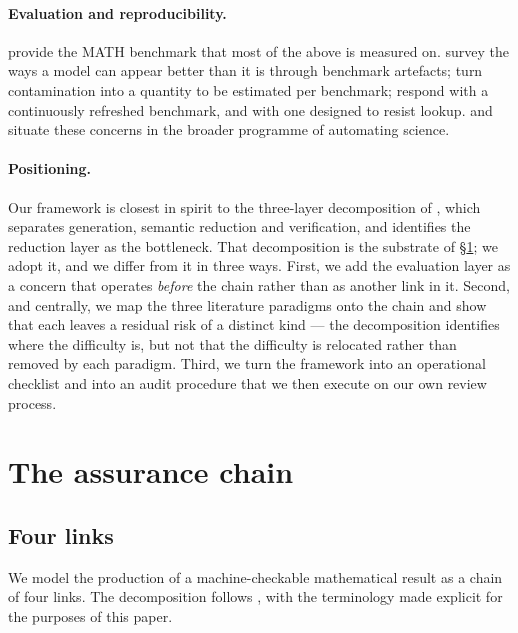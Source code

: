 \documentclass[11pt,a4paper]{article}
\begin{document}
\paragraph{Evaluation and reproducibility.} \citet{hendrycks2021math} provide
the MATH benchmark that most of the above is measured on. \citet{zhou2023cheater}
survey the ways a model can appear better than it is through benchmark
artefacts; \citet{sainz2023contamination} turn contamination into a quantity to
be estimated per benchmark; \citet{white2024livebench} respond with a
continuously refreshed benchmark, and \citet{rein2023gpqa} with one designed to
resist lookup. \citet{wang2023scientific} and \citet{lu2024aiscientist}
situate these concerns in the broader programme of automating science.

\paragraph{Positioning.} Our framework is closest in spirit to the three-layer
decomposition of \citet{chen2026lectures}, which separates generation,
semantic reduction and verification, and identifies the reduction layer as the
bottleneck. That decomposition is the substrate of \S\ref{sec:framework}; we
adopt it, and we differ from it in three ways. First, we add the evaluation
layer as a concern that operates \emph{before} the chain rather than as another
link in it. Second, and centrally, we map the three literature paradigms onto
the chain and show that each leaves a residual risk of a distinct kind --- the
decomposition identifies where the difficulty is, but not that the difficulty is
relocated rather than removed by each paradigm. Third, we turn the framework
into an operational checklist and into an audit procedure that we then execute
on our own review process.

\section{The assurance chain}
\label{sec:framework}

\subsection{Four links}

We model the production of a machine-checkable mathematical result as a chain
of four links. The decomposition follows \citet{chen2026lectures}, with the
terminology made explicit for the purposes of this paper.
\end{document}

